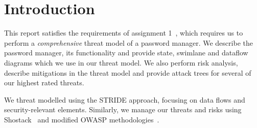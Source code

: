 \chapter{Introduction}
\label{ch:introduction}

This report satisfies the requirements of assignment
1~\cite{2017myersa1handout}, which requires us to perform a
\textit{comprehensive} threat model of a password manager.  We describe the
password manager, its functionality and provide state, swimlane and dataflow diagrams
which we use in our threat model. We also perform risk analysis, describe
mitigations in the threat model and provide attack trees for several of our
highest rated threats.  

\par We threat modelled using the STRIDE approach, focusing on data flows and security-relevant elements.
Similarly, we manage our threats and risks using Shostack~\cite{shostackbook} and
modified OWASP methodologies~\cite{owasprisk}.





